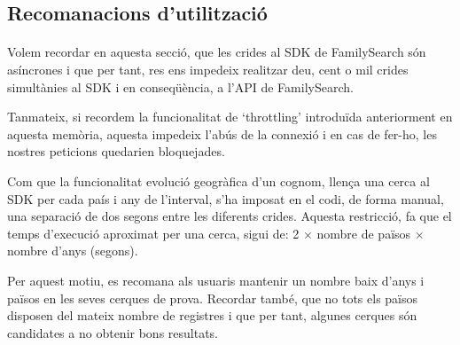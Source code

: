 \subsection{Recomanacions d'utilització}

    \paragraph{}
    Volem recordar en aquesta secció, que les crides al SDK de FamilySearch són asíncrones i que per tant, res ens impedeix realitzar deu, cent o mil crides simultànies al SDK i en conseqüència, a l’API de FamilySearch.

    Tanmateix, si recordem la funcionalitat de `throttling' introduïda anteriorment en aquesta memòria, aquesta impedeix l’abús de la connexió i en cas de fer-ho, les nostres peticions quedarien bloquejades.

    Com que la funcionalitat evolució geogràfica d’un cognom, llença una cerca al SDK per cada país i any de l’interval, s'ha imposat en el codi, de forma manual, una separació de dos segons entre les diferents crides. Aquesta restricció, fa que el temps d'execució aproximat per una cerca, sigui de: 2 $\times$ nombre de països $\times$ nombre d'anys (segons).

    Per aquest motiu, es recomana als usuaris mantenir un nombre baix d'anys i països en les seves cerques de prova. Recordar també, que no tots els països disposen del mateix nombre de registres i que per tant, algunes cerques són candidates a no obtenir bons resultats.

